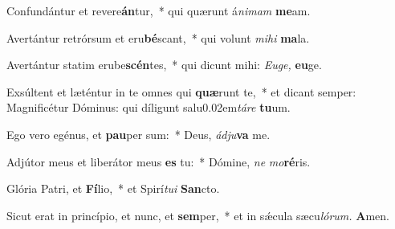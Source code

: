 \item Confundántur et revere\textbf{án}tur,~* qui quærunt á\tinyhspace\textit{nimam} \textbf{me}am.
\item Avertántur retrórsum et eru\textbf{bé}scant,~* qui volunt \textit{mihi} \textbf{ma}la.
\item Avertántur statim erube\textbf{scén}tes,~* qui dicunt mihi: \textit{Euge,} \textbf{eu}ge.
\item Exsúltent et læténtur in te omnes qui \textbf{quæ}runt te,~* et dicant semper: Magnificétur Dóminus: qui díligunt salu\kern 0.02em\textit{táre} \textbf{tu}um.
\item Ego vero egénus, et \textbf{pau}per sum:~* Deus, \textit{ádju}\textbf{va} me.
\item Adjútor meus et liberátor meus \textbf{es} tu:~* Dómine, \textit{ne} \textit{mo}\textbf{ré}ris.
\item Glória Patri, et \textbf{Fí}lio,~* et Spirí\tinyhspace\textit{tui} \textbf{San}cto.
\item Sicut erat in princípio, et nunc, et \textbf{sem}per,~* et in sǽcula sæcu\tinyhspace\textit{lórum.} \textbf{A}men.
